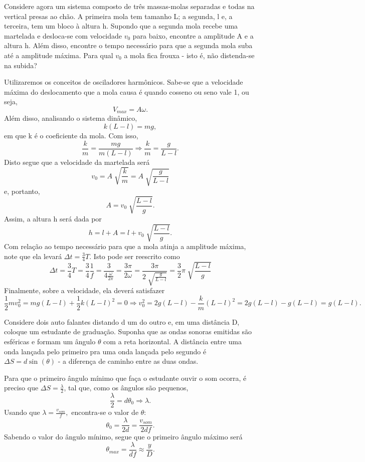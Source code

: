 \documentclass[phsyicsII_notes.tex]{subfiles}
\begin{document}
\begin{example}
	Considere agora um sistema composto de três massas-molas separadas e todas na vertical presas ao chão. A primeira mola tem tamanho L; a segunda, l e, a terceira,
	tem um bloco à altura h. Supondo que a segunda mola recebe uma martelada e desloca-se com velocidade \(v_{0}\) para baixo, encontre a amplitude A e a altura h. Além disso,
	encontre o tempo necessário para que a segunda mola suba até a amplitude máxima. Para qual \(v_{0}\) a mola fica frouxa - isto é, não distenda-se na subida?

	Utilizaremos os conceitos de osciladores harmônicos. Sabe-se que a velocidade máxima do deslocamento que a mola causa é quando cosseno ou seno vale 1, ou seja,
	\[
		V_{max} = A\omega .
	\]
	Além disso, analisando o sistema dinâmico,
	\[
		k(L-l) = mg,
	\]
	em que k é o coeficiente da mola. Com isso,
	\[
		\frac{k}{m} = \frac{mg}{m(L-l)} \Rightarrow \frac{k}{m} = \frac{g}{L-l}.
	\]
	Disto segue que a velocidade da martelada será
	\[
		v_{0}=A\sqrt[]{\frac{k}{m}} = A\sqrt[]{\frac{g}{L-l}}
	\]
	e, portanto,
	\[
		A = v_{0}\sqrt[]{\frac{L-l}{g}}.
	\]
	Assim, a altura h será dada por
	\[
		h = l + A = l + v_{0}\sqrt[]{\frac{L-l}{g}}.
	\]
	Com relação ao tempo necessário para que a mola atinja a amplitude máxima, note que ela levará \(\Delta t = \frac{3}{4}T\). Isto pode ser reescrito como
	\[
		\Delta t = \frac{3}{4}T = \frac{3}{4}\frac{1}{f} = \frac{3}{4\frac{\omega }{2\pi }} = \frac{3\pi }{2\omega } = \frac{3\pi }{2\sqrt[]{\frac{g}{L-l}}} = \frac{3}{2}\pi \sqrt[]{\frac{L-l}{g}}
	\]
	Finalmente, sobre a velocidade, ela deverá satisfazer
	\[
		\frac{1}{2}mv_{0}^{2} = mg(L-l) + \frac{1}{2}k(L-l)^{2} = 0 \Rightarrow v_{0}^{2} = 2g(L-l) - \frac{k}{m}(L-l)^{2} = 2g(L-l)-g(L-l) = g(L-l).
	\]
\end{example}
\begin{example}
	Considere dois auto falantes distando d um do outro e, em uma distância D, coloque um estudante de graduação. Suponha que as ondas sonoras emitidas são esféricas e formam
	um ângulo \(\theta \) com a reta horizontal. A distância entre uma onda lançada pelo primeiro pra uma onda lançada pelo segundo é \(\Delta S = d\sin^{}{(\theta )}\) - a diferença de caminho entre
	as duas ondas.

	Para que o primeiro ângulo mínimo que faça o estudante ouvir o som ocorra, é preciso que \(\Delta S = \frac{\lambda }{2}\), tal que, como os ângulos são pequenos,
	\[
		\frac{\lambda }{2} = d\theta_{0} \Rightarrow \lambda.
	\]
	Usando que \(\lambda  = \frac{v_{som}}{f},\) encontra-se o valor de \(\theta \):
	\[
		\theta_{0} = \frac{\lambda }{2d} = \frac{v_{som}}{2df}.
	\]
	Sabendo o valor do ângulo mínimo, segue que o primeiro ângulo máximo será
	\[
		\theta_{max} = \frac{\lambda }{df}\approx \frac{y}{D}.
	\]
\end{example}
\end{document}
